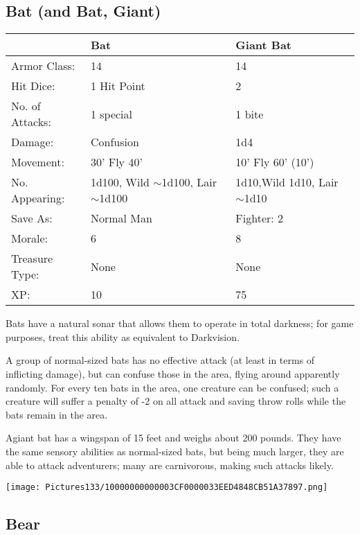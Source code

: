\documentclass[a4paper,twoside,openany,10pt]{book}
\begin{document}
\begin{multicols}{2}
\subsection*{Bat (and Bat, Giant)}\label{bat-and-bat-giant}


\begin{flushleft}
	\begin{tabularx}{0.48\textwidth}{lXX}
& Bat & Giant Bat \\\hline
Armor Class: & 14 & 14 \\\hline
Hit Dice: & 1 Hit Point & 2 \\\hline
No. of Attacks: & 1 special & 1 bite \\\hline
Damage: & Confusion & 1d4 \\\hline
Movement: & 30' Fly 40' &10' Fly 60' (10') \\\hline
No. Appearing: & 1d100, Wild $\sim$1d100, Lair $\sim$1d100 & 1d10,Wild 1d10, Lair $\sim$1d10 \\\hline
Save As: & Normal Man & Fighter: 2 \\\hline
Morale: & 6 & 8 \\\hline
Treasure Type: & None & None \\\hline
XP: & 10 & 75 \\\hline
\end{tabularx}\medskip
\end{flushleft}

Bats have a natural sonar that allows them to operate in total darkness; for game purposes, treat this ability as equivalent to Darkvision.

A group of normal-sized bats has no effective attack (at least in terms of inflicting damage), but can confuse those in the area, flying around apparently randomly. For every ten bats in the area, one creature can be confused; such a creature will suffer a penalty of -2 on all attack and saving throw rolls while the bats remain in the area.

Agiant bat has a wingspan of 15 feet and weighs about 200 pounds. They have the same sensory abilities as normal-sized bats, but being much larger, they are able to attack adventurers; many are carnivorous, making such attacks likely.

\begin{center}
	\texttt{[image: Pictures133/10000000000003CF0000033EED4848CB51A37897.png]}
\end{center}


\subsection*{Bear}\label{bear}


\end{multicols}
\end{document}
